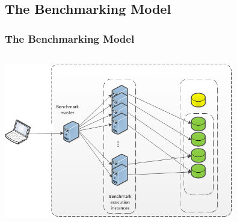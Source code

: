 \documentclass[12pt]{beamer}
\begin{document}
\subsection{The Benchmarking Model}
\begin{frame}[c]
\frametitle{The Benchmarking Model}
\centering
   \includegraphics[width=10cm, height=7.5cm]{images/benchmarkmodel}

\end{frame}

\end{document}
